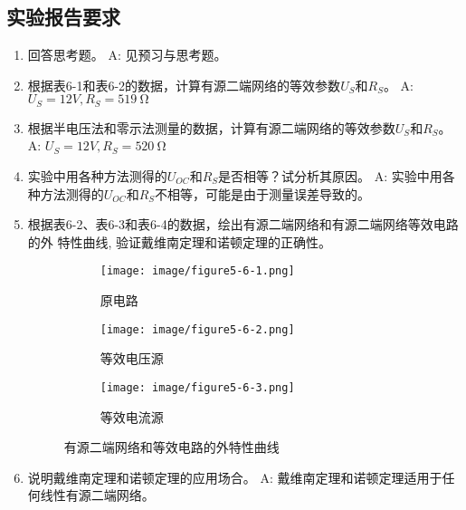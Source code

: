 \documentclass[UTF8]{article}
\begin{document}
        \subsection{实验报告要求}
            \begin{enumerate}[label=\textbf{\arabic*}.]
                \item 回答思考题。\newline
                A: 见预习与思考题。
                \item 根据表6-1和表6-2的数据，计算有源二端网络的等效参数$U_S$和$R_S$。\newline
                A: $U_S = 12V, R_S = \SI{519}{\ohm}$
                \item 根据半电压法和零示法测量的数据，计算有源二端网络的等效参数$U_S$和$R_S$。\newline
                A: $U_S = 12V, R_S = \SI{520}{\ohm}$
                \item 实验中用各种方法测得的$U_{OC}$和$R_S$是否相等？试分析其原因。\newline
                A: 实验中用各种方法测得的$U_{OC}$和$R_S$不相等，可能是由于测量误差导致的。
                \item 根据表6-2、表6-3和表6-4的数据，绘出有源二端网络和有源二端网络等效电路的外
                特性曲线, 验证戴维南定理和诺顿定理的正确性。
                \begin{figure}[H]
                    \centering
                    \begin{subfigure}[H]{0.45\textwidth}
                        \centering
                        \texttt{[image: image/figure5-6-1.png]}
                        \caption{原电路}
                    \end{subfigure}
                    \hfill
                    \begin{subfigure}[H]{0.45\textwidth}
                        \centering
                        \texttt{[image: image/figure5-6-2.png]}
                        \caption{等效电压源}
                    \end{subfigure}
                    \begin{subfigure}[H]{0.45\textwidth}
                        \centering
                        \texttt{[image: image/figure5-6-3.png]}
                        \caption{等效电流源}   
                    \end{subfigure}
                    \caption{有源二端网络和等效电路的外特性曲线}
                \end{figure}
                \item 说明戴维南定理和诺顿定理的应用场合。\newline
                A: 戴维南定理和诺顿定理适用于任何线性有源二端网络。
            \end{enumerate}
\end{document}

